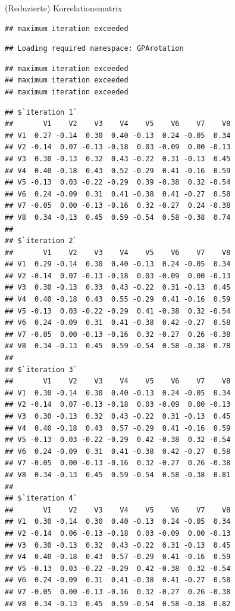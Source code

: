 \documentclass[
  ignorenonframetext,
]{beamer}
\begin{document}
\begin{frame}[fragile]{(Reduzierte) Korrelationsmatrix}
\protect\hypertarget{reduzierte-korrelationsmatrix}{}
\begin{verbatim}
## maximum iteration exceeded
\end{verbatim}

\begin{verbatim}
## Loading required namespace: GPArotation
\end{verbatim}

\begin{verbatim}
## maximum iteration exceeded
## maximum iteration exceeded
## maximum iteration exceeded
\end{verbatim}

\begin{verbatim}
## $`iteration 1`
##       V1    V2    V3    V4    V5    V6    V7    V8
## V1  0.27 -0.14  0.30  0.40 -0.13  0.24 -0.05  0.34
## V2 -0.14  0.07 -0.13 -0.18  0.03 -0.09  0.00 -0.13
## V3  0.30 -0.13  0.32  0.43 -0.22  0.31 -0.13  0.45
## V4  0.40 -0.18  0.43  0.52 -0.29  0.41 -0.16  0.59
## V5 -0.13  0.03 -0.22 -0.29  0.39 -0.38  0.32 -0.54
## V6  0.24 -0.09  0.31  0.41 -0.38  0.41 -0.27  0.58
## V7 -0.05  0.00 -0.13 -0.16  0.32 -0.27  0.24 -0.38
## V8  0.34 -0.13  0.45  0.59 -0.54  0.58 -0.38  0.74
## 
## $`iteration 2`
##       V1    V2    V3    V4    V5    V6    V7    V8
## V1  0.29 -0.14  0.30  0.40 -0.13  0.24 -0.05  0.34
## V2 -0.14  0.07 -0.13 -0.18  0.03 -0.09  0.00 -0.13
## V3  0.30 -0.13  0.33  0.43 -0.22  0.31 -0.13  0.45
## V4  0.40 -0.18  0.43  0.55 -0.29  0.41 -0.16  0.59
## V5 -0.13  0.03 -0.22 -0.29  0.41 -0.38  0.32 -0.54
## V6  0.24 -0.09  0.31  0.41 -0.38  0.42 -0.27  0.58
## V7 -0.05  0.00 -0.13 -0.16  0.32 -0.27  0.26 -0.38
## V8  0.34 -0.13  0.45  0.59 -0.54  0.58 -0.38  0.78
## 
## $`iteration 3`
##       V1    V2    V3    V4    V5    V6    V7    V8
## V1  0.30 -0.14  0.30  0.40 -0.13  0.24 -0.05  0.34
## V2 -0.14  0.07 -0.13 -0.18  0.03 -0.09  0.00 -0.13
## V3  0.30 -0.13  0.32  0.43 -0.22  0.31 -0.13  0.45
## V4  0.40 -0.18  0.43  0.57 -0.29  0.41 -0.16  0.59
## V5 -0.13  0.03 -0.22 -0.29  0.42 -0.38  0.32 -0.54
## V6  0.24 -0.09  0.31  0.41 -0.38  0.42 -0.27  0.58
## V7 -0.05  0.00 -0.13 -0.16  0.32 -0.27  0.26 -0.38
## V8  0.34 -0.13  0.45  0.59 -0.54  0.58 -0.38  0.81
## 
## $`iteration 4`
##       V1    V2    V3    V4    V5    V6    V7    V8
## V1  0.30 -0.14  0.30  0.40 -0.13  0.24 -0.05  0.34
## V2 -0.14  0.06 -0.13 -0.18  0.03 -0.09  0.00 -0.13
## V3  0.30 -0.13  0.32  0.43 -0.22  0.31 -0.13  0.45
## V4  0.40 -0.18  0.43  0.57 -0.29  0.41 -0.16  0.59
## V5 -0.13  0.03 -0.22 -0.29  0.42 -0.38  0.32 -0.54
## V6  0.24 -0.09  0.31  0.41 -0.38  0.41 -0.27  0.58
## V7 -0.05  0.00 -0.13 -0.16  0.32 -0.27  0.26 -0.38
## V8  0.34 -0.13  0.45  0.59 -0.54  0.58 -0.38  0.82
\end{verbatim}
\end{frame}
\end{document}
